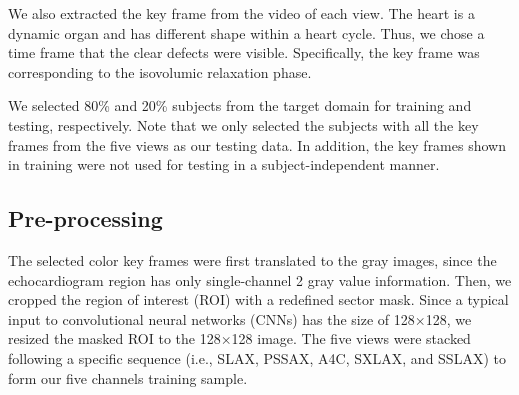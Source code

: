 We also extracted the key frame from the video of each view. The heart is a dynamic organ and has different shape within a heart cycle. Thus, we chose a time frame that the clear defects were visible. Specifically, the key frame was corresponding to the isovolumic relaxation phase.


We selected 80\% and 20\% subjects from the target domain for training and testing, respectively. Note that we only selected the subjects with all the key frames from the five views as our testing data. In addition, the key frames shown in training were not used for testing in a subject-independent manner. 


\subsection{Pre-processing}

The selected color key frames were first translated to the gray images, since the echocardiogram region has only single-channel 2 gray value information. Then, we cropped the region of interest (ROI) with a redefined sector mask. Since a typical input to convolutional neural networks (CNNs) has the size of 128$\times$128, we resized the masked ROI to the 128$\times$128 image. The five views were stacked following a specific sequence (i.e., SLAX, PSSAX, A4C, SXLAX, and SSLAX) to form our five channels training sample.





